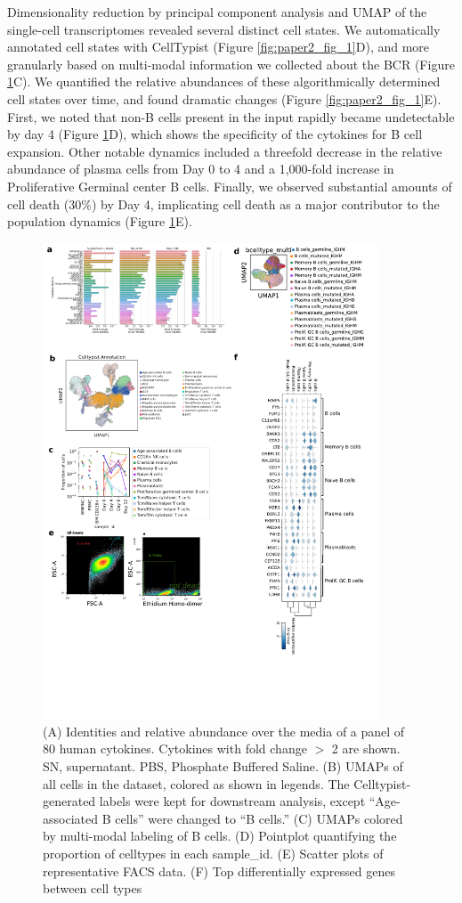 Dimensionality reduction by principal component analysis and UMAP\cite{mcinnes_umap_2018} of the single-cell transcriptomes revealed several distinct cell states. We automatically annotated cell states with CellTypist (Figure \ref{fig:paper2_fig_1}D)\cite{dominguez_conde_cross-tissue_2022}, and more granularly based on multi-modal information we collected about the BCR (Figure \ref{fig:paper2_fig_s1}C). We quantified the relative abundances of these algorithmically determined cell states over time, and found dramatic changes (Figure \ref{fig:paper2_fig_1}E). First, we noted that non-B cells present in the input rapidly became undetectable by day 4 (Figure \ref{fig:paper2_fig_s1}D), which shows the specificity of the cytokines for B cell expansion. Other notable dynamics included a threefold decrease in the relative abundance of plasma cells from Day 0 to 4 and a 1,000-fold increase in Proliferative Germinal center B cells. Finally, we observed substantial amounts of cell death (30\%) by Day 4, implicating cell death as a major contributor to the population dynamics (Figure \ref{fig:paper2_fig_s1}E).
\begin{figure}[hbt!]
\centering
\includegraphics[width=10cm, keepaspectratio]{figs/InVitro/figS1_bcd.pdf}
\caption[Analysis of stimulation cocktail and presentation of pre-processing steps.]{(A) Identities and relative abundance over the media of a panel of 80 human cytokines. Cytokines with fold change $>$ 2 are shown. SN, supernatant. PBS, Phosphate Buffered Saline. (B) UMAPs of all cells in the dataset, colored as shown in legends. The Celltypist-generated labels were kept for downstream analysis, except “Age-associated B cells” were changed to “B cells.” (C) UMAPs colored by multi-modal labeling of B cells. (D) Pointplot quantifying the proportion of celltypes in each sample\_id. (E) Scatter plots of representative FACS data. (F) Top differentially expressed genes between cell types}
\label{fig:paper2_fig_s1}
\end{figure}


